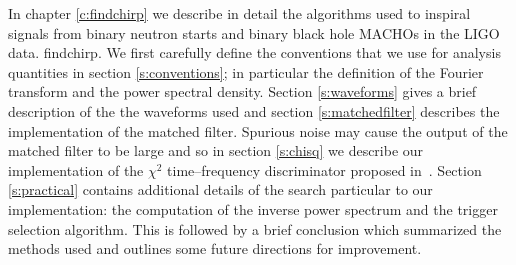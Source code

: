 
In chapter \ref{c:findchirp} we describe in detail the algorithms used to
inspiral signals from binary neutron starts and binary black hole MACHOs in
the LIGO data.  findchirp. We first carefully define the conventions that we
use for analysis quantities in section \ref{s:conventions}; in particular the
definition of the Fourier transform and the power spectral density. Section
\ref{s:waveforms} gives a brief description of the the waveforms used and
section \ref{s:matchedfilter} describes the implementation of the matched
filter.  Spurious noise may cause the output of the matched filter to be large
and so in section \ref{s:chisq} we describe our implementation of the $\chi^2$
time--frequency discriminator proposed in~\cite{allen}. Section
\ref{s:practical} contains additional details of the search particular to our
implementation: the computation of the inverse power spectrum and the trigger
selection algorithm. This is followed by a brief conclusion which summarized
the methods used and outlines some future directions for improvement.

